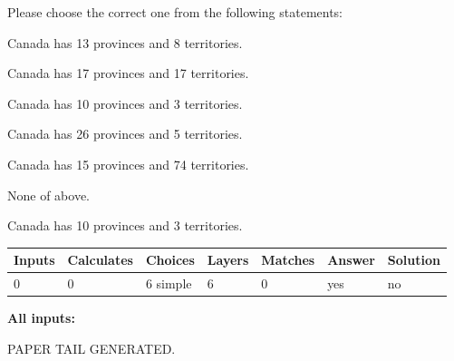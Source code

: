 \documentclass[12pt]{article}
\begin{document}
  
Please choose the correct one from the following statements:
 
 
Canada has  13 provinces and  8 territories.
 
 
Canada has  17 provinces and  17 territories.
 
 
Canada has 10  provinces and 3 territories.
 
 
Canada has  26 provinces and  5 territories.
 
 
Canada has  15 provinces and  74 territories.
 
 
 None of above.
 
 
\noindent{}
 
 
Canada has 10  provinces and 3 territories.
 
 
\noindent{}
 
 
   
   
   
   
\noindent\begin{tabular}{|l|l|l|l|l|l|l|}
 \hline
Inputs & Calculates & Choices & Layers & Matches & Answer & Solution \\ \hline
 0  & 
 0  & 
 6
  simple  
  & 
 6  & 
 0  & 
  yes & 
  no 
  \\ \hline
 \end{tabular}
   
   
   
   
\noindent{}
   
   
   
   
\noindent\vspace{0.1in}\hspace{-0.08in} {\textbf{\Large{All inputs: }}}
   
   
   
   
   
   
 \vspace{0.2in}
 
   
   
\vspace{2.0in} PAPER TAIL GENERATED.
   
   
   
\end{document}
